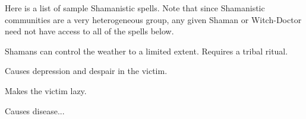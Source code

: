 Here is a list of sample Shamanistic spells. Note that since Shamanistic communities are a very heterogeneous group, any given Shaman or Witch-Doctor need not have access to all of the spells below. 

Shamans can control the weather to a limited extent. Requires a tribal ritual. 

Causes depression and despair in the victim. 

Makes the victim lazy. 

Causes disease... 



